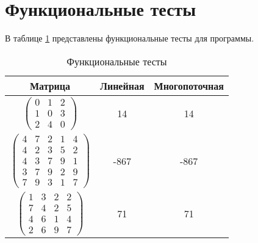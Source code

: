 \section{Функциональные тесты}
\hspace{\parindent}В таблице  \ref{tbl:testing} представлены функциональные тесты для программы.
\begin{table}[h]
	\begin{center}
		\captionsetup{skip=0pt,justification=raggedright,singlelinecheck=off}
		\caption{Функциональные тесты}
		\label{tbl:testing}
		\begin{tabular}{|c|c|c|}
			\hline
			Матрица & Линейная & Многопоточная\\
			\hline
			 $\begin{pmatrix}
				0 & 1 & 2\\
				1 & 0 & 3\\
				2 & 4 & 0
			\end{pmatrix}$ &
			14 &
			14 \\
			\hline
			$\begin{pmatrix}
				4 & 7 & 2 & 1 & 4\\
				4 & 2 & 3 & 5 & 2\\
				4 & 3 & 7 & 9 & 1\\
				3 & 7 & 9 & 2 & 9\\
				7 & 9 & 3 & 1 & 7
			\end{pmatrix}$ &
			-867 & -867 \\
			\hline
			$\begin{pmatrix}
				1 & 3 & 2 & 2\\
				7 & 4 & 2 & 5\\
				4 & 6 & 1 & 4\\
				2 & 6 & 9 & 7
			\end{pmatrix}$ &
			71 & 71 \\
			\hline
		\end{tabular}	
	\end{center}
\end{table}